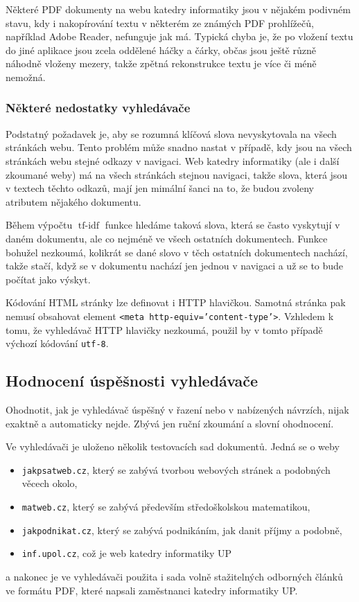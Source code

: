 \documentclass[12pt]{article}
\newcommand{\code}[1]{\texttt{#1}}
\newcommand{\ssection}[1]{\subsection{#1}}
\newcommand{\sssection}[1]{\subsubsection{#1}}
\DeclareMathOperator{\tfidf}{tf-idf}
\begin{document}
Některé PDF dokumenty na webu katedry informatiky jsou v nějakém podivném stavu, kdy i nakopírování textu v některém ze známých PDF prohlížečů, například Adobe Reader, nefunguje jak má. Typická chyba je, že po vložení textu do jiné aplikace jsou zcela oddělené háčky a čárky, občas jsou ještě různě náhodně vloženy mezery, takže zpětná rekonstrukce textu je více či méně nemožná. 

\sssection{Některé nedostatky vyhledávače}\label{ch.nedostatky}

Podstatný požadavek je, aby se rozumná klíčová slova nevyskytovala na všech stránkách webu. Tento problém může snadno nastat v případě, kdy jsou na všech stránkách webu stejné odkazy v navigaci. Web katedry informatiky (ale i další zkoumané weby) má na všech stránkách stejnou navigaci, takže slova, která jsou v textech těchto odkazů, mají jen mimální šanci na to, že budou zvoleny atributem nějakého dokumentu. 

Během výpočtu $\tfidf$ funkce hledáme taková slova, která se často vyskytují v daném dokumentu, ale co nejméně ve všech ostatních dokumentech. Funkce bohužel nezkoumá, kolikrát se dané slovo v těch ostatních dokumentech nachází, takže stačí, když se v dokumentu nachází jen jednou v navigaci a už se to bude počítat jako výskyt. 

Kódování HTML stránky lze definovat i HTTP hlavičkou. Samotná stránka pak nemusí obsahovat element \code{<meta http-equiv='content-type'>}. Vzhledem k tomu, že vyhledávač HTTP hlavičky nezkoumá, použil by v tomto případě výchozí kódování \code{utf-8}. 

\ssection{Hodnocení úspěšnosti vyhledávače}
Ohodnotit, jak je vyhledávač úspěšný v řazení nebo v nabízených návrzích, nijak exaktně a automaticky nejde. Zbývá jen ruční zkoumání a slovní ohodnocení. 

Ve vyhledávači je uloženo několik testovacích sad dokumentů. Jedná se o weby 
\begin{itemize}
	\item \code{jakpsatweb.cz}, který se zabývá tvorbou webových stránek a podobných věcech okolo, 
	\item \code{matweb.cz}, který se zabývá především středoškolskou matematikou,
	\item \code{jakpodnikat.cz}, který se zabývá podnikáním, jak danit příjmy a podobně,
	\item \code{inf.upol.cz}, což je web katedry informatiky UP
\end{itemize}
a nakonec je ve vyhledávači použita i sada volně stažitelných odborných článků ve formátu PDF, které napsali zaměstnanci katedry informatiky UP. 
\end{document}
